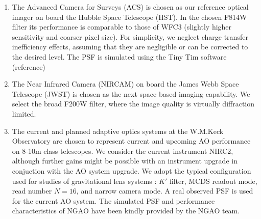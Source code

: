 \documentclass[a4paper,11pt]{article}
\begin{document}
\begin{enumerate}

\item  The Advanced Camera for Surveys (ACS) is chosen as our reference optical imager on board the Hubble Space Telescope (HST). In the chosen F814W filter its performance is comparable to those of WFC3 (slightly higher sensitivity and coarser pixel size). For simplicity, we neglect charge transfer inefficiency effects, assuming that they are negligible or can be corrected to the desired level. The PSF is simulated using the Tiny Tim software (reference)
    
\item The Near Infrared Camera (NIRCAM) on board the James Webb Space Telescope (JWST) is chosen as the next space based imaging capability. We select the broad F200W filter, where the image quality is virtually diffraction limited. 


\item The current and planned adaptive optics systems \citep[hereafter LGSAO \& NGAO][respectively]{2006PASP..118..297W,2010SPIE.7736E..0KW} at the W.M.Keck Observatory are chosen to represent current and upcoming AO performance on 8-10m class telescopes. We consider the current instrument NIRC2, although further gains might be possible with an instrument upgrade in conjuction with the AO system upgrade. We adopt the typical configuration used for studies of gravitational lens systems \citep{Fassnacht}: $K'$ filter, MCDS readout mode, read number $N=16$, and narrow camera mode. A real observed PSF is used for the current AO system. The simulated PSF and performance characteristics of NGAO have been kindly provided by the NGAO team.
    

\end{enumerate}
\end{document}
